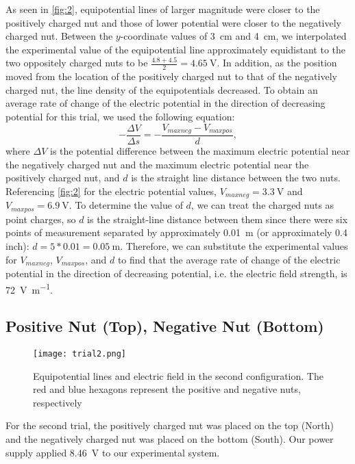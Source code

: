\documentclass[10pt,journal,twoside]{IEEEtran}
\begin{document}
As seen in \cref{fig:2}, equipotential lines of larger magnitude were closer to the positively charged nut and those of lower potential were closer to the negatively charged nut. Between the $y$-coordinate values of \qty{3}{\centi\meter} and \qty{4}{\centi\meter}, we interpolated the experimental value of the equipotential line approximately equidistant to the two oppositely charged nuts to be $\frac{4.8+4.5}{2}=\qty{4.65}{\volt}$. In addition, as the position moved from the location of the positively charged nut to that of the negatively charged nut, the line density of the equipotentials decreased. To obtain an average rate of change of the electric potential in the direction of decreasing potential for this trial, we used the following equation:
\begin{equation}
-\frac{\Delta V}{\Delta s} = -\frac{V_{max neg} - V_{max pos}}{d},
\label{eq:2}
\end{equation}
\noindent where $\Delta V$ is the potential difference between the maximum electric potential near the negatively charged nut and the maximum electric potential near the positively charged nut, and $d$ is the straight line distance between the two nuts. Referencing \cref{fig:2} for the electric potential values, $V_{max neg} = \qty{3.3}{\volt}$ and $V_{max pos} = \qty{6.9}{\volt}$. To determine the value of $d$, we can treat the charged nuts as point charges, so $d$ is the straight-line distance between them since there were six points of measurement separated by approximately \qty{0.01}{\meter} (or approximately 0.4 inch): $d= 5 * 0.01 = \qty{0.05}{\meter}$. Therefore, we can substitute the experimental values for $V_{max neg}$, $V_{max pos}$, and $d$ to find that the average rate of change of the electric potential in the direction of decreasing potential, i.e. the electric field strength, is \qty{72}{\volt\per\meter}.

\subsection{Positive Nut (Top), Negative Nut (Bottom)}
\begin{figure}
\begin{center}
\texttt{[image: trial2.png]} %
\end{center}
\caption{Equipotential lines and electric field in the second configuration. The red and blue hexagons represent the positive and negative nuts, respectively}
\label{fig:3}
\end{figure}
For the second trial, the positively charged nut was placed on the top (North) and the negatively charged nut was placed on the bottom (South). Our power supply applied \qty{8.46}{\volt} to our experimental system.
\end{document}
